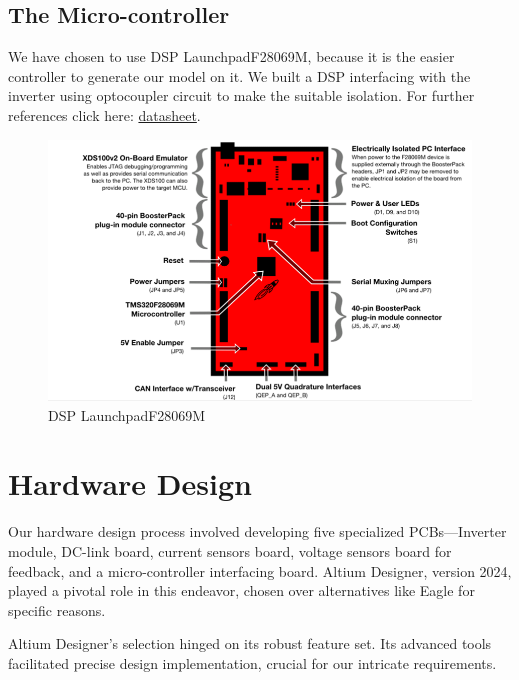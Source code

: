 \documentclass[12pt,a4paper]{book}
\begin{document}
\subsection{The Micro-controller}
We have chosen to use DSP LaunchpadF28069M, because it is the easier controller to generate our model on it. We built a DSP interfacing with the inverter using optocoupler circuit to make the suitable isolation. For further references click here: \href{https://www.ti.com/lit/ug/sprui11b/sprui11b.pdf?ts=1706193932351}{datasheet}.
\begin{figure}[h!]
  \centering
  \includegraphics[width = 15cm]{image46.png}
  \caption{DSP LaunchpadF28069M}
  \label{fig:image46}
\end{figure}

\section{Hardware Design}
Our hardware design process involved developing five specialized PCBs—Inverter module, DC-link board, current sensors board, voltage sensors board for feedback, and a micro-controller interfacing board. Altium Designer, version 2024, played a pivotal role in this endeavor, chosen over alternatives like Eagle for specific reasons.

Altium Designer's selection hinged on its robust feature set. Its advanced tools facilitated precise design implementation, crucial for our intricate requirements.
\end{document}
